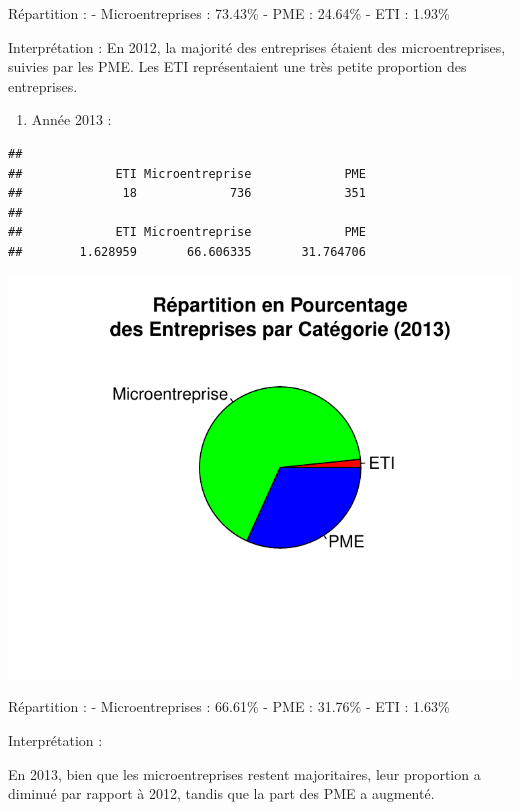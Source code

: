 \documentclass[mstat,12pt]{unswthesis}
\begin{document}
Répartition : - Microentreprises : 73.43\% - PME : 24.64\% - ETI :
1.93\%

Interprétation : En 2012, la majorité des entreprises étaient des
microentreprises, suivies par les PME. Les ETI représentaient une très
petite proportion des entreprises.

\medskip

\begin{enumerate}
\def\labelenumi{\arabic{enumi})}
\setcounter{enumi}{1}
\tightlist
\item
  Année 2013 :
\end{enumerate}

\begin{verbatim}
## 
##             ETI Microentreprise             PME 
##              18             736             351 
## 
##             ETI Microentreprise             PME 
##        1.628959       66.606335       31.764706
\end{verbatim}

\includegraphics{TDDT_projet_L_2_files/figure-latex/analyse_univariee_2013-1.pdf}

\medskip

Répartition : - Microentreprises : 66.61\% - PME : 31.76\% - ETI :
1.63\%

Interprétation :

\medskip

En 2013, bien que les microentreprises restent majoritaires, leur
proportion a diminué par rapport à 2012, tandis que la part des PME a
augmenté.
\end{document}
